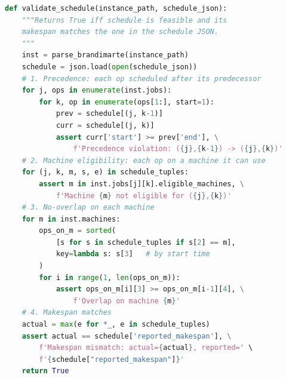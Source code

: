 \documentclass[10pt]{article}
\theoremstyle{definition}
\begin{document}
\begin{lstlisting}[language=python, basicstyle=\ttfamily\footnotesize]
def validate_schedule(instance_path, schedule_json):
    """Returns True iff schedule is feasible and its
    makespan matches the one in the schedule JSON.
    """
    inst = parse_brandimarte(instance_path)
    schedule = json.load(open(schedule_json))
    # 1. Precedence: each op scheduled after its predecessor
    for j, ops in enumerate(inst.jobs):
        for k, op in enumerate(ops[1:], start=1):
            prev = schedule[(j, k-1)]
            curr = schedule[(j, k)]
            assert curr['start'] >= prev['end'], \
                f'Precedence violation: ({j},{k-1}) -> ({j},{k})'
    # 2. Machine eligibility: each op on a machine it can use
    for (j, k, m, s, e) in schedule_tuples:
        assert m in inst.jobs[j][k].eligible_machines, \
            f'Machine {m} not eligible for ({j},{k})'
    # 3. No-overlap on each machine
    for m in inst.machines:
        ops_on_m = sorted(
            [s for s in schedule_tuples if s[2] == m],
            key=lambda s: s[3]   # by start time
        )
        for i in range(1, len(ops_on_m)):
            assert ops_on_m[i][3] >= ops_on_m[i-1][4], \
                f'Overlap on machine {m}'
    # 4. Makespan matches
    actual = max(e for *_, e in schedule_tuples)
    assert actual == schedule['reported_makespan'], \
        f'Makespan mismatch: actual={actual}, reported=' \
        f'{schedule["reported_makespan"]}'
    return True
\end{lstlisting}
\end{document}
